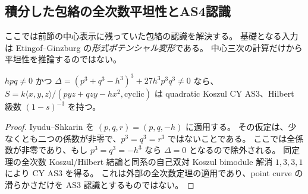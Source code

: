 \subsection{積分した包絡の全次数平坦性とAS4認識}
\label{subsec:integrated-envelope-recognition}
ここでは前節の中心表示に残っていた包絡の認識を解決する。
基礎となる入力は Etingof--Ginzburg
\cite[Proposition 7.3.1(i), Lemma 7.2.1, Corollary 7.2.4]{EGdelpezzo}
の\emph{形式ポテンシャル変形}である。
中心三次の計算だけから平坦性を推論するのではない。

\begin{lemma}
\label{lem:integrated-leading-as3}
$hpq\ne0$ かつ
$\Delta=(p^3+q^3-h^3)^3+27h^3p^3q^3\ne0$ なら、
$S=k\langle x,y,z\rangle/(pyz+qzy-hx^2,\text{cyclic})$
は quadratic Koszul CY AS3、Hilbert 級数 $(1-s)^{-3}$ を持つ。
\end{lemma}
\begin{proof}
Iyudu--Shkarin \cite[Theorem 1.1, Corollary 6.1]{ISSklyanin}を
$(p,q,r)=(p,q,-h)$ に適用する。
その仮定は、少なくとも二つの係数が非零で、$p^3=q^3=r^3$ ではないことである。
ここでは全係数が非零であり、もし $p^3=q^3=-h^3$ なら $\Delta=0$ となるので除外される。
同定理の全次数 Koszul/Hilbert 結論と同系の自己双対 Koszul bimodule 解消
$1,3,3,1$ により CY AS3 を得る。
これは外部の全次数定理の適用であり、point curve の滑らかさだけを
AS3 認識とするものではない。
\end{proof}

